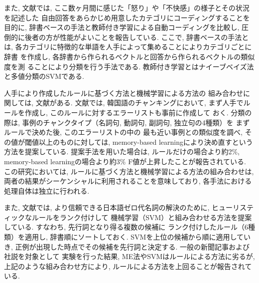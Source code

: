 \documentclass{nlp}
\begin{document}
また, 文献\cite{Giorgetti03}では, 
ここ数ヶ月間に感じた「怒り」や「不快感」の様子とその状況を記述した
自由回答をあらかじめ用意したカテゴリにコーディングすることを目的に, 
辞書ベースの手法と教師付き学習による自動コーディングを比較し, 
圧倒的に後者の方が性能がよいことを報告している. 
ここで, 辞書ベースの手法とは, 
各カテゴリに特徴的な単語を人手によって集めることによりカテゴリごとに辞書
を作成し, 各辞書から作られるベクトルと回答から作られるベクトルの類似度を測
ることにより分類を行う手法である. 
教師付き学習とはナイーブベイズ法と多値分類のSVMである. 

人手により作成したルールに基づく方法と機械学習による方法の
組み合わせに関しては, 文献\cite{Seng-Bae03,Isozaki_et_al03}がある. 
文献\cite{Seng-Bae03}では, 韓国語のチャンキングにおいて, 
まず人手でルールを作成し, このルールに対するエラーリストも事前に作成して
おく. 
分類の際は, 事例のチャンクタイプ（名詞句, 動詞句, 副詞句, 独立句の4種類）を
まずルールで決めた後, 
このエラーリストの中の
最も近い事例との類似度を調べ, 
その値が閾値以上のものに対しては, 
memory-based learningにより決め直すという方法を提案している. 
提案手法を用いた場合は, 
ルールだけの場合より約2$\%$, 
memory-based learningの場合より約3$\%$ 
F値が上昇したことが報告されている. 
この研究においては, 
ルールに基づく方法と機械学習による方法の組み合わせは, 
両者の結果がシーケンシャルに利用されることを意味しており, 
各手法における処理自体は独立に行われる. 

また, 文献\cite{Isozaki_et_al03}では, 
より信頼できる日本語ゼロ代名詞の解決のために, 
ヒューリスティックなルールをランク付けして
機械学習（SVM）と組み合わせる方法を提案している. 
すなわち, 
先行詞となり得る複数の候補に
ランク付けしたルール（6種類）を適用し, 
辞書順にソートしておく. 
SVMを上位の候補から順に適用していき, 
正例が出現した時点でその候補を先行詞と決定する. 
一般の新聞記事および社説を対象として 実験を行った結果, 
ME法やSVMはルールによる方法に劣るが, 
上記のような組み合わせ方により, 
ルールによる方法を上回ることが報告されている. 
\end{document}
